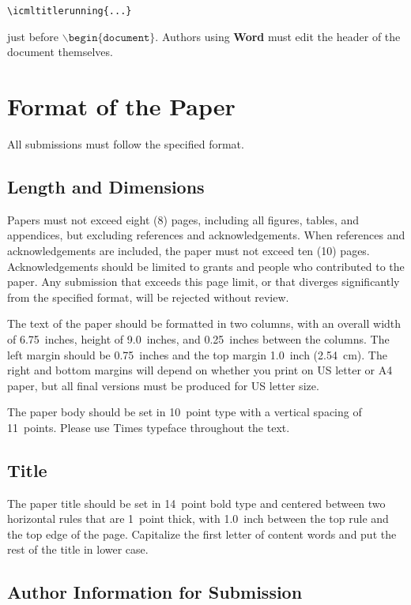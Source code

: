 \documentclass{article}
\begin{document}
\verb|\icmltitlerunning{...}|

just before $\mathtt{\backslash begin\{document\}}$.
Authors using \textbf{Word} must edit the header of the document themselves.

\section{Format of the Paper}

All submissions must follow the specified format.

\subsection{Length and Dimensions}

Papers must not exceed eight (8) pages, including all figures, tables,
and appendices, but excluding references and acknowledgements. When references and acknowledgements are included,
the paper must not exceed ten (10) pages.
Acknowledgements should be limited to grants and people who contributed to the paper.
Any submission that exceeds
this page limit, or that diverges significantly from the specified format,
will be rejected without review.

The text of the paper should be formatted in two columns, with an
overall width of 6.75~inches, height of 9.0~inches, and 0.25~inches
between the columns. The left margin should be 0.75~inches and the top
margin 1.0~inch (2.54~cm). The right and bottom margins will depend on
whether you print on US letter or A4 paper, but all final versions
must be produced for US letter size.

The paper body should be set in 10~point type with a vertical spacing
of 11~points. Please use Times typeface throughout the text.

\subsection{Title}

The paper title should be set in 14~point bold type and centered
between two horizontal rules that are 1~point thick, with 1.0~inch
between the top rule and the top edge of the page. Capitalize the
first letter of content words and put the rest of the title in lower
case.

\subsection{Author Information for Submission}
\label{author info}
\end{document}
